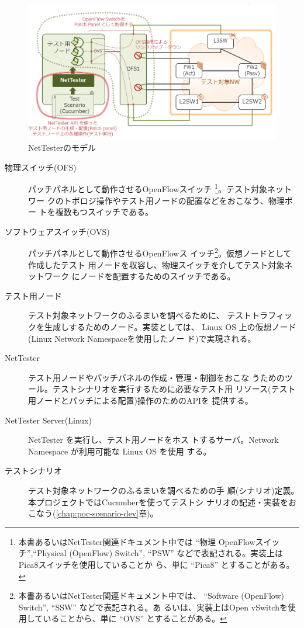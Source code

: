 \begin{figure}[h]
 \centering
 \includegraphics[scale=0.6]{img/model-nettester.png}
 \caption{NetTesterのモデル}
 \label{fig:model-nettester}
\end{figure}


\begin{description}
 \item[物理スイッチ(OFS)] パッチパネルとして動作させるOpenFlowスイッチ
            \footnote{本書あるいはNetTester関連ドキュメント中では ``物理
            OpenFlowスイッチ'',``Physical (OpenFlow) Switch'', ``PSW''
            などで表記される。実装上はPica8スイッチを使用していることか
            ら、単に ``Pica8'' とすることがある。}。テスト対象ネットワー
            クのトポロジ操作やテスト用ノードの配置などをおこなう、物理ポー
            トを複数もつスイッチである。
 \item[ソフトウェアスイッチ(OVS)] パッチパネルとして動作させるOpenFlowス
            イッチ\footnote{本書あるいはNetTester関連ドキュメント中では、
            ``Software (OpenFlow) Switch'', ``SSW'' などで表記される。あ
            るいは、実装上はOpen vSwitchを使用していることから、単に
            ``OVS'' とすることがある。}。仮想ノードとして作成したテスト
            用ノードを収容し、物理スイッチを介してテスト対象ネットワーク
            にノードを配置するためのスイッチである。
 \item[テスト用ノード] テスト対象ネットワークのふるまいを調べるために、
            テストトラフィックを生成しするためのノード。実装としては、
            Linux OS 上の仮想ノード(Linux Network Namespaceを使用したノー
            ド)で実現される。
 \item[NetTester] テスト用ノードやパッチパネルの作成・管理・制御をおこな
            うためのツール。テストシナリオを実行するために必要なテスト用
            リソース(テスト用ノードとパッチによる配置)操作のためのAPIを
            提供する。
 \item[NetTester Server(Linux)] NetTester を実行し、テスト用ノードをホス
            トするサーバ。Network Namespace が利用可能な Linux OS を使用
            する。
 \item[テストシナリオ] テスト対象ネットワークのふるまいを調べるための手
            順(シナリオ)定義。本プロジェクトではCucumberを使ってテストシ
            ナリオの記述・実装をおこなう(\ref{chap:poc-scenario-dev}章)。
\end{description}

